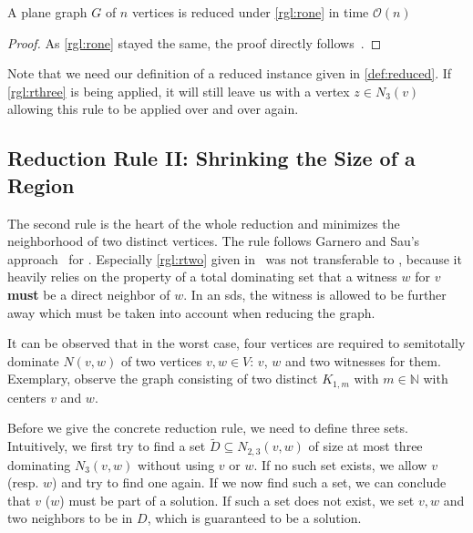 \begin{lemma}\label{complex:rone}
    A plane graph $G$ of $n$ vertices is reduced under \cref{rgl:rone} in time $\mathcal{O}(n)$
\end{lemma}
\begin{proof}
    As \cref{rgl:rone} stayed the same, the proof directly follows~\cite[Lemma 2]{Alber2004}.
\end{proof}

Note that we need our definition of a reduced instance given in \cref{def:reduced}. 
If \cref{rgl:rthree} is being applied, it will still leave us with a vertex $z\in N_3(v)$ allowing this rule to be applied over and over again.
\subsection{Reduction Rule II: Shrinking the Size of a Region}

The second rule is the heart of the whole reduction and minimizes the neighborhood of two distinct vertices. The rule follows Garnero and Sau's approach~\cite{Garnero2018} for \ptdom. Especially \cref{rgl:rtwo} given in~\cite[arXiv v2]{Garnero2018} was not transferable to \psdom, because it heavily relies on the property of a total dominating set that a witness $w$ for $v$ \textbf{must} be a direct neighbor of $w$. 
In an sds, the witness is allowed to be further away which must be taken into account when reducing the graph.


It can be observed that in the worst case, four vertices are required to semitotally dominate $N(v,w)$ of two vertices $v,w \in V$: $v$, $w$ and two witnesses for them. 
Exemplary, observe the graph consisting of two distinct $K_{1,m}$ with $m \in \mathbb{N}$ with centers $v$ and $w$.

Before we give the concrete reduction rule, we need to define three sets. Intuitively, we first try to find a set $\tilde D \subseteq N_{2,3}(v,w)$ of size at most three dominating $N_3(v,w)$ without using $v$ or $w$. If no such set exists, we allow $v$ (resp. $w$) and try to find one again. 
If we now find such a set, we can conclude that $v$ ($w$) must be part of a solution.
If such a set does not exist, we set $v,w$ and two neighbors to be in $D$, which is guaranteed to be a solution.

